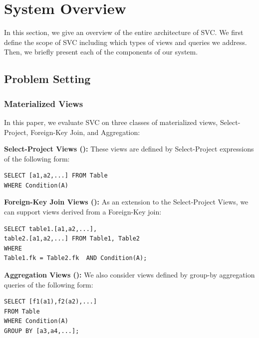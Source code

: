 \section{System Overview}\label{sec-arch}
In this section, we give an overview of the entire architecture of SVC.
We first define the scope of SVC including which types of views and queries we address.
Then, we briefly present each of the components of our system.

\subsection{Problem Setting}
\subsubsection{Materialized Views}
In this paper, we evaluate SVC on three classes of materialized views, Select-Project, Foreign-Key Join, and Aggregation:
\vspace{0.25em}

\noindent\textbf{Select-Project Views (\spview): } These views are defined by Select-Project
expressions of the following form:

\begin{lstlisting}
SELECT [a1,a2,...] FROM Table 
WHERE Condition(A) 
\end{lstlisting}

\vspace{0.25em}

\noindent\textbf{Foreign-Key Join Views (\fjview): } As an extension to the Select-Project Views, we can support views derived from a Foreign-Key join:

\begin{lstlisting}
SELECT table1.[a1,a2,...],
table2.[a1,a2,...] FROM Table1, Table2 
WHERE
Table1.fk = Table2.fk  AND Condition(A);
\end{lstlisting}

\vspace{0.25em}

\noindent\textbf{Aggregation Views (\aggview): } We also consider views defined by group-by aggregation queries of the following form:

\begin{lstlisting}
SELECT [f1(a1),f2(a2),...] 
FROM Table 
WHERE Condition(A)
GROUP BY [a3,a4,...];
\end{lstlisting}

